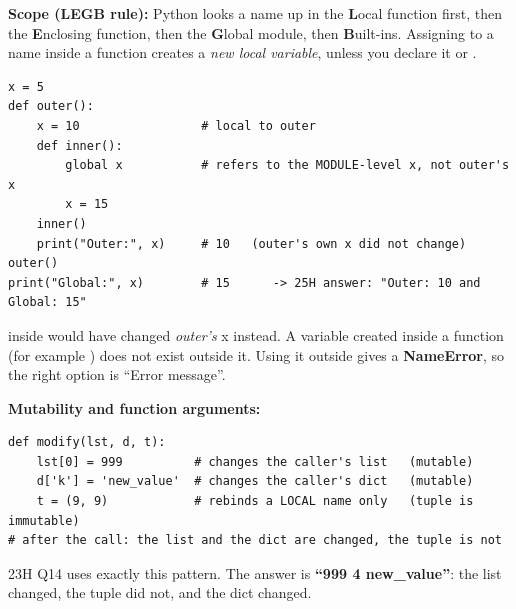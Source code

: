 \begin{idea}
\textbf{Scope (LEGB rule):} Python looks a name up in the \textbf{L}ocal function first, then the \textbf{E}nclosing function, then the \textbf{G}lobal module, then \textbf{B}uilt-ins.
Assigning to a name inside a function creates a \emph{new local variable}, unless you declare it  or .
\end{idea}
\begin{codebox}
\begin{Verbatim}
x = 5
def outer():
    x = 10                 # local to outer
    def inner():
        global x           # refers to the MODULE-level x, not outer's x
        x = 15
    inner()
    print("Outer:", x)     # 10   (outer's own x did not change)
outer()
print("Global:", x)        # 15      -> 25H answer: "Outer: 10 and Global: 15"
\end{Verbatim}
\end{codebox}
 inside  would have changed \emph{outer's} x instead.
A variable created inside a function (for example ) does not exist outside it. Using it outside gives a \textbf{NameError}, so the right option is ``Error message''.

\textbf{Mutability and function arguments:}
\begin{codebox}
\begin{Verbatim}
def modify(lst, d, t):
    lst[0] = 999          # changes the caller's list   (mutable)
    d['k'] = 'new_value'  # changes the caller's dict   (mutable)
    t = (9, 9)            # rebinds a LOCAL name only   (tuple is immutable)
# after the call: the list and the dict are changed, the tuple is not
\end{Verbatim}
\end{codebox}
23H Q14 uses exactly this pattern. The answer is \textbf{``999 4 new\_value''}: the list changed, the tuple did not, and the dict changed.

